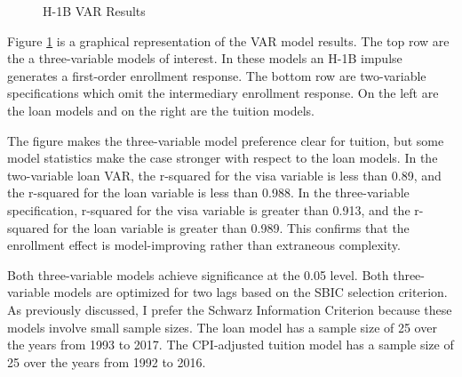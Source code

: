 \documentclass[review]{elsarticle}
\begin{document}
    \begin{figure}[h!]
        \centering
        \caption{H-1B VAR Results}
        \label{fig:var_results}
        \end{figure}

    Figure \ref{fig:var_results} is a graphical representation of the VAR model results.
    The top row are the a three-variable models of interest.
    In these models an H-1B impulse generates a first-order enrollment response.
    The bottom row are two-variable specifications which omit the intermediary enrollment response.
    On the left are the loan models and on the right are the tuition models.

    The figure makes the three-variable model preference clear for tuition,
    but some model statistics make the case stronger with respect to the loan models.
    In the two-variable loan VAR, the r-squared for the visa variable is less than 0.89,
    and the r-squared for the loan variable is less than 0.988.
    In the three-variable specification, r-squared for the visa variable is greater than 0.913,
    and the r-squared for the loan variable is greater than 0.989.
    This confirms that the enrollment effect is model-improving rather than extraneous complexity.

    Both three-variable models achieve significance at the 0.05 level.
    Both three-variable models are optimized for two lags based on the SBIC selection criterion.
    As previously discussed, I prefer the Schwarz Information Criterion because these models involve small sample sizes.
    The loan model has a sample size of 25 over the years from 1993 to 2017.
    The CPI-adjusted tuition model has a sample size of 25 over the years from 1992 to 2016.
\end{document}
